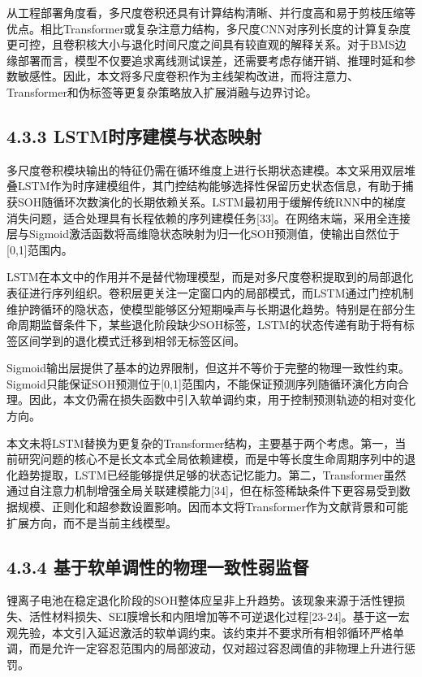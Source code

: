 \documentclass[12pt, a4paper]{ctexart}
\begin{document}
从工程部署角度看，多尺度卷积还具有计算结构清晰、并行度高和易于剪枝压缩等优点。相比Transformer或复杂注意力结构，多尺度CNN对序列长度的计算复杂度更可控，且卷积核大小与退化时间尺度之间具有较直观的解释关系。对于BMS边缘部署而言，模型不仅要追求离线测试误差，还需要考虑存储开销、推理时延和参数敏感性。因此，本文将多尺度卷积作为主线架构改进，而将注意力、Transformer和伪标签等更复杂策略放入扩展消融与边界讨论。



\subsection{4.3.3 LSTM时序建模与状态映射}

多尺度卷积模块输出的特征仍需在循环维度上进行长期状态建模。本文采用双层堆叠LSTM作为时序建模组件，其门控结构能够选择性保留历史状态信息，有助于捕获SOH随循环次数演化的长期依赖关系。LSTM最初用于缓解传统RNN中的梯度消失问题，适合处理具有长程依赖的序列建模任务[33]。在网络末端，采用全连接层与Sigmoid激活函数将高维隐状态映射为归一化SOH预测值，使输出自然位于[0,1]范围内。


LSTM在本文中的作用并不是替代物理模型，而是对多尺度卷积提取到的局部退化表征进行序列组织。卷积层更关注一定窗口内的局部模式，而LSTM通过门控机制维护跨循环的隐状态，使模型能够区分短期噪声与长期退化趋势。特别是在部分生命周期监督条件下，某些退化阶段缺少SOH标签，LSTM的状态传递有助于将有标签区间学到的退化模式迁移到相邻无标签区间。


Sigmoid输出层提供了基本的边界限制，但这并不等价于完整的物理一致性约束。Sigmoid只能保证SOH预测位于[0,1]范围内，不能保证预测序列随循环演化方向合理。因此，本文仍需在损失函数中引入软单调约束，用于控制预测轨迹的相对变化方向。


本文未将LSTM替换为更复杂的Transformer结构，主要基于两个考虑。第一，当前研究问题的核心不是长文本式全局依赖建模，而是中等长度生命周期序列中的退化趋势提取，LSTM已经能够提供足够的状态记忆能力。第二，Transformer虽然通过自注意力机制增强全局关联建模能力[34]，但在标签稀缺条件下更容易受到数据规模、正则化和超参数设置影响。因而本文将Transformer作为文献背景和可能扩展方向，而不是当前主线模型。



\subsection{4.3.4 基于软单调性的物理一致性弱监督}

锂离子电池在稳定退化阶段的SOH整体应呈非上升趋势。该现象来源于活性锂损失、活性材料损失、SEI膜增长和内阻增加等不可逆退化过程[23-24]。基于这一宏观先验，本文引入延迟激活的软单调约束。该约束并不要求所有相邻循环严格单调，而是允许一定容忍范围内的局部波动，仅对超过容忍阈值的非物理上升进行惩罚。
\end{document}
